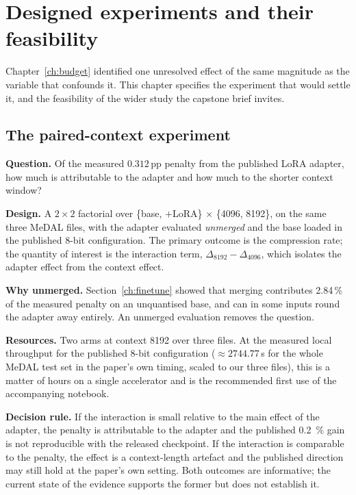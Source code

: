 \documentclass[11pt,a4paper]{article}
\begin{document}
\section{Designed experiments and their feasibility}
\label{ch:experiments}

Chapter~\ref{ch:budget} identified one unresolved effect of the same magnitude as
the variable that confounds it. This chapter specifies the experiment that would
settle it, and the feasibility of the wider study the capstone brief invites.

\subsection{The paired-context experiment}

\textbf{Question.} Of the measured $\num{+0.312}$\,pp penalty from the published
LoRA adapter, how much is attributable to the adapter and how much to the shorter
context window?

\textbf{Design.} A $2\times2$ factorial over \{base, $+$LoRA\} $\times$ \{4096,
8192\}, on the same three MeDAL files, with the adapter evaluated \emph{unmerged}
and the base loaded in the published 8-bit configuration. The primary outcome is
the compression rate; the quantity of interest is the interaction term,
$\Delta_{8192} - \Delta_{4096}$, which isolates the adapter effect from the
context effect.

\textbf{Why unmerged.} Section~\ref{ch:finetune} showed that merging contributes
\num{2.84}\,\% of the measured penalty on an unquantised base, and can in some
inputs round the adapter away entirely. An unmerged evaluation removes the
question.

\textbf{Resources.} Two arms at context \num{8192} over three files. At the
measured local throughput for the published 8-bit configuration
($\approx\num{2744.77}$\,s for the whole MeDAL test set in the paper's own
timing, scaled to our three files), this is a matter of hours on a single
accelerator and is the recommended first use of the accompanying notebook.

\textbf{Decision rule.} If the interaction is small relative to the main effect of
the adapter, the penalty is attributable to the adapter and the published
\SI{0.2}{\%} gain is not reproducible with the released checkpoint. If the
interaction is comparable to the penalty, the effect is a context-length artefact
and the published direction may still hold at the paper's own setting. Both
outcomes are informative; the current state of the evidence supports the former
but does not establish it.
\end{document}
